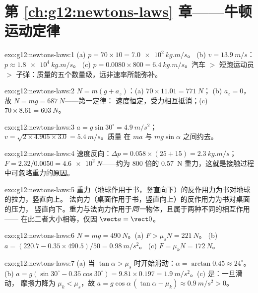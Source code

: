 \section*{第 \ref{ch:g12:newtons-laws} 章——牛顿运动定律}

\begin{solution}{exo:g12:newtons-laws:1}
(a) $p = 70 \times 10 = \qty{7.0e2}{kg.m/s}$。
(b) $v = \qty{13.9}{m/s}$：$p \approx \qty{1.8e4}{kg.m/s}$。
(c) $p = 0.0080 \times 800 = \qty{6.4}{kg.m/s}$。汽车 $>$ 短跑运动员 $>$
子弹：质量的五个数量级，远非速率所能弥补。
\end{solution}

\begin{solution}{exo:g12:newtons-laws:2}
$N = m(g + a_z)$：(a) $70 \times 11.01 = \qty{771}{N}$；
(b) $a_z = 0$，故 $N = mg = \qty{687}{N}$——第一定律：
速度恒定，受力相互抵消；(c) $70 \times 8.61 = \qty{603}{N}$。
\end{solution}

\begin{solution}{exo:g12:newtons-laws:3}
$a = g\sin 30^\circ = \qty{4.9}{m/s^2}$；
$v = \sqrt{2 \times 4.905 \times 3.0} = \qty{5.4}{m/s}$。质量
在 $ma$ 与 $mg\sin\alpha$ 之间约去。
\end{solution}

\begin{solution}{exo:g12:newtons-laws:4}
速度反向：$\Delta p = 0.058 \times (25 + 15) = \qty{2.3}{kg.m/s}$；
$F = 2.32/0.0050 = \qty{4.6e2}{N}$——约为 $800$ 倍的
\qty{0.57}{N} 重力，这就是接触过程中可忽略重力的原因。
\end{solution}

\begin{solution}{exo:g12:newtons-laws:5}
重力（地球作用于书，竖直向下）的反作用力为书对地球的拉力，竖直向上。
法向力（桌面作用于书，竖直向上）的反作用力为书对桌面的压力，
竖直向下。重力与法向力作用于\emph{同一}物体，且属于两种不同的相互作用——
在此二者大小相等，仅因 $\vect a = \vect 0$。
\end{solution}

\begin{solution}{exo:g12:newtons-laws:6}
$N = mg = \qty{490}{N}$。(a) $F > \mu_s N = \qty{221}{N}$。
(b) $a = (220.7 - 0.35 \times 490.5)/50 = \qty{0.98}{m/s^2}$。
(c) $F = \mu_k N = \qty{172}{N}$。
\end{solution}

\begin{solution}{exo:g12:newtons-laws:7}
(a) 当 $\tan\alpha > \mu_s$ 时开始滑动：$\alpha = \arctan 0.45 \approx
24^\circ$。(b) $a = g(\sin 30^\circ - 0.35\cos 30^\circ) =
9.81 \times 0.197 = \qty{1.9}{m/s^2}$。(c) 是：一旦滑动，
摩擦力降为 $\mu_k < \mu_s$，故
$a = g\cos\alpha\,(\tan\alpha - \mu_k) \approx \qty{0.9}{m/s^2} > 0$。
\end{solution}

